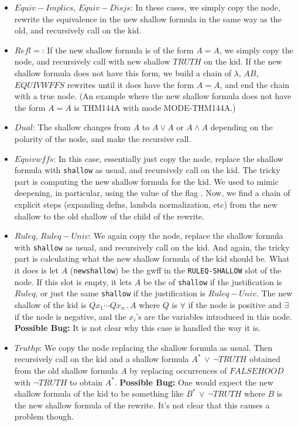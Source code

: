 \begin{enumerate}
\begin{itemize}
\item $Equiv-Implics$, $Equiv-Disjs$:  In these cases, we simply copy the node,
rewrite the equivalence in the new shallow formula in the same way as the old,
and recursively call  on the kid.
\item $Refl=$:  If the new shallow formula is of the form $A = A$,
we simply copy the node, and recursively
call  with new shallow $TRUTH$ on the kid.
If the new shallow formula does not have this form, we build a chain of $\lambda$,
$AB$, $EQUIVWFFS$ rewrites until it does have the form $A = A$, and end the
chain with a true node.  (An example where the new shallow formula does
not have the form $A = A$ is THM144A with mode MODE-THM144A.)
\item $Dual$: The shallow changes from $A$ to $A\lor A$ or
$A\land A$ depending on the polarity of the node, and make
the recursive call.
\item $Equivwffs$:  In this case, essentially just copy the
node, replace the shallow formula with \verb+shallow+ as usual, and recursively call
 on the kid.  The tricky part
is computing the new shallow formula for the kid.  We used to mimic
deepening, in particular, using the value of the flag .
Now, we find a chain of explicit steps (expanding defns, lambda normalization, etc)
from the new shallow to the old shallow of the child of the rewrite.

\item $Ruleq$, $Ruleq-Univ$:  We again copy the
node, replace the shallow formula with \verb+shallow+ as usual, and recursively call
 on the kid.  And again, the tricky part
is calculating what the new shallow formula of the kid should be.
What it does is let $A$ (\verb+newshallow+) be the 
gwff in the \verb+RULEQ-SHALLOW+ slot of the node.
If this slot is empty, it lets $A$ be the 
of \verb+shallow+ if the justification is $Ruleq$, or just the
same \verb+shallow+ if the justification is $Ruleq-Univ$.
The new shallow of the kid is $Qx_1\cdots Qx_n \, . \, A$
where $Q$ is $\forall$ if the node is positive and $\exists$ if the node is
negative, and the $x_i$'s are the variables introduced in this node.
{\bf Possible Bug:}  It is not clear why this case is handled
the way it is.

\item $Truthp$:  We copy the node replacing the shallow formula as usual.
Then recursively call  on the kid
and a shallow
formula $A^* \, \lor\, \lnot TRUTH$
obtained from the old shallow formula $A$ by replacing occurrences
of $FALSEHOOD$ with $\lnot TRUTH$ to obtain $A^*$.
{\bf Possible Bug:}  One would expect the new shallow formula of the kid
to be something like $B^* \, \lor \, \lnot TRUTH$ where $B$ is the
new shallow formula of the rewrite.  It's not clear that this causes a problem
though.
\end{itemize}
\end{enumerate}


